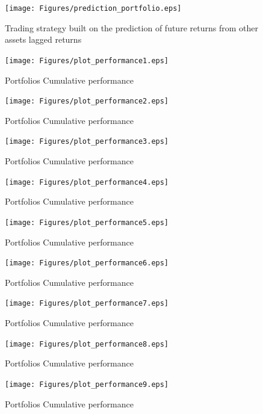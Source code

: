 \documentclass[a4paper]{article}
\begin{document}
\begin{figure}[htbp]
	\centering
	\texttt{[image: Figures/prediction\_portfolio.eps]}
	\caption{Trading strategy built on the prediction of future returns from other assets lagged returns}
	\label{prediction}
\end{figure}

\begin{figure}[htbp]
	\centering
	\texttt{[image: Figures/plot\_performance1.eps]}
	\caption{Portfolios Cumulative performance}
\end{figure}

\begin{figure}[htbp]
	\centering
	\texttt{[image: Figures/plot\_performance2.eps]}
	\caption{Portfolios Cumulative performance}
\end{figure}

\begin{figure}[htbp]
	\centering
	\texttt{[image: Figures/plot\_performance3.eps]}
	\caption{Portfolios Cumulative performance}
\end{figure}

\begin{figure}[htbp]
	\centering
	\texttt{[image: Figures/plot\_performance4.eps]}
	\caption{Portfolios Cumulative performance}
\end{figure}

\begin{figure}[htbp]
	\centering
	\texttt{[image: Figures/plot\_performance5.eps]}
	\caption{Portfolios Cumulative performance}
\end{figure}

\begin{figure}[htbp]
	\centering
	\texttt{[image: Figures/plot\_performance6.eps]}
	\caption{Portfolios Cumulative performance}
\end{figure}


\begin{figure}[htbp]
	\centering
	\texttt{[image: Figures/plot\_performance7.eps]}
	\caption{Portfolios Cumulative performance}
\end{figure}


\begin{figure}[htbp]
	\centering
	\texttt{[image: Figures/plot\_performance8.eps]}
	\caption{Portfolios Cumulative performance}
\end{figure}

\begin{figure}[htbp]
	\centering
	\texttt{[image: Figures/plot\_performance9.eps]}
	\caption{Portfolios Cumulative performance}
\end{figure}
\end{document}
